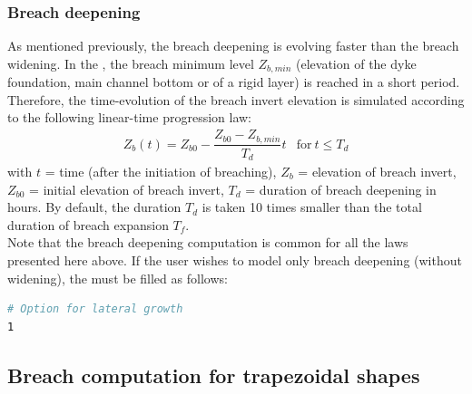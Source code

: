 \subsubsection{Breach deepening}
As mentioned previously, the breach deepening is evolving faster than the breach
widening.
In the \telemacsystem, the breach minimum level $Z_{b,min}$ (elevation
of the dyke foundation, main channel bottom or of a rigid layer) is reached in a short period.
Therefore, the time-evolution of the breach invert elevation is simulated
according to the following linear-time progression law:
\begin{equation}
\begin{array}{lc}
Z_b(t)=Z_{b0}-\dfrac{Z_{b0}-Z_{b,min}}{T_d}t & \text{for}~t\leq T_d
\end{array}
\end{equation}
with $t$ = time (after the initiation of breaching), $Z_b$ = elevation of breach
invert, $Z_{b0}$ = initial elevation of breach invert, $T_d$ = duration of breach
deepening in hours.
By default, the duration $T_d$ is taken 10 times smaller than the total duration
of breach expansion $T_f$.\\
Note that the breach deepening computation is common for all the laws presented
here above.
If the user wishes to model only breach deepening (without widening),
the  must be filled as follows:
\begin{lstlisting}[language=bash]
# Option for lateral growth
1
\end{lstlisting}
\subsection{Breach computation for trapezoidal shapes}

